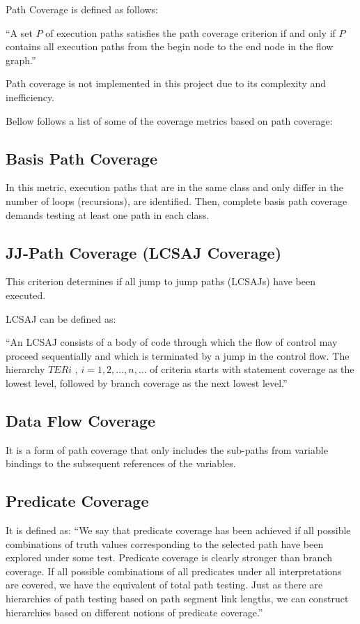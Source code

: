 \documentclass[12pt,a4paper]{report}
\begin{document}
Path Coverage is defined as follows:

``A set $P$ of execution paths satisfies the path coverage criterion if and only if $P$ contains all execution paths from the begin node to the end node in the flow graph.''\cite{Zhu:1997:SUT:267580.267590}

Path coverage is not implemented in this project due to its complexity and inefficiency. 

Bellow follows a list of some of the coverage metrics based on path coverage:
\subsection{Basis Path Coverage}
In this metric, execution paths that are in the same class and only differ in the number of loops (recursions), are identified. Then, complete basis path coverage demands testing at least one path in each class.

\subsection{JJ-Path Coverage (LCSAJ Coverage)}
This criterion determines if all jump to jump paths (LCSAJs) have been executed. 

LCSAJ can be defined as:

``An LCSAJ consists of a body of code through which the flow of control may proceed sequentially and which is terminated by a jump in the control flow. The hierarchy $TERi$ , $i = 1, 2, . . . ,n, . . .$ of criteria starts with statement coverage as the lowest level, followed by branch coverage as the next lowest level.''\cite{Zhu:1997:SUT:267580.267590}

\subsection{Data Flow Coverage}
It is a form of path coverage that only includes the sub-paths from variable bindings to the subsequent references of the variables.
 
\subsection{Predicate Coverage}
It is defined as:
``We say that predicate coverage has been achieved if all possible combinations of truth values corresponding to the selected path have been explored under some test. Predicate coverage is clearly stronger than branch coverage. If all possible combinations of all predicates under all interpretations are covered, we have the equivalent of total path testing. Just as there are hierarchies of path testing based on path segment link lengths, we can construct hierarchies based on different notions of predicate coverage.''\cite{beizer2002software}
\end{document}
